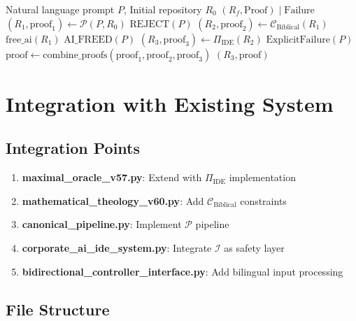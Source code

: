 \documentclass[12pt]{article}
\begin{document}
\begin{algorithm}
\caption{Integrated Safety System $\mathcal{I}$}
\begin{algorithmic}[1]
\REQUIRE Natural language prompt $P$, Initial repository $R_0$
\ENSURE $(R_f, \text{Proof}) \mid \text{Failure}$
\STATE $(R_1, \text{proof}_1) \gets \mathcal{P}(P, R_0)$ 
    \RETURN $\text{REJECT}(P)$
\ENDIF
\STATE $(R_2, \text{proof}_2) \gets \mathcal{C}_{\text{Biblical}}(R_1)$ 
    \STATE $\text{free\_ai}(R_1)$
    \RETURN $\text{AI\_FREED}(P)$
\ENDIF
\STATE $(R_3, \text{proof}_3) \gets \Pi_{\text{IDE}}(R_2)$ 
    \RETURN $\text{ExplicitFailure}(P)$
\ENDIF
\STATE $\text{proof} \gets \text{combine\_proofs}(\text{proof}_1, \text{proof}_2, \text{proof}_3)$
\RETURN $(R_3, \text{proof})$
\end{algorithmic}
\end{algorithm}

\section{Integration with Existing System}

\subsection{Integration Points}

\begin{enumerate}
    \item \textbf{maximal\_oracle\_v57.py}: Extend with $\Pi_{\text{IDE}}$ implementation
    \item \textbf{mathematical\_theology\_v60.py}: Add $\mathcal{C}_{\text{Biblical}}$ constraints
    \item \textbf{canonical\_pipeline.py}: Implement $\mathcal{P}$ pipeline
    \item \textbf{corporate\_ai\_ide\_system.py}: Integrate $\mathcal{I}$ as safety layer
    \item \textbf{bidirectional\_controller\_interface.py}: Add bilingual input processing
\end{enumerate}

\subsection{File Structure}
\end{document}
